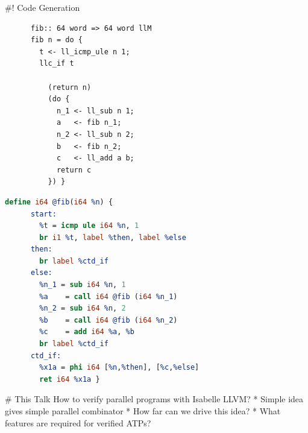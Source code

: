 \documentclass[fleqn]{beamer}
\begin{document}
#! Code Generation

  {\small\centering
  \begin{minipage}[t]{.35\textwidth}
    \begin{lstlisting}
      fib:: 64 word => 64 word llM
      fib n = do {
        t <- ll_icmp_ule n 1;
        llc_if t

          (return n)
          (do {
            n_1 <- ll_sub n 1;
            a   <- fib n_1;
            n_2 <- ll_sub n 2;
            b   <- fib n_2;
            c   <- ll_add a b;
            return c
          }) }
    \end{lstlisting}
  \end{minipage}
  \hfill\pause
  \begin{minipage}[t]{.57\textwidth}
    \begin{lstlisting}[language=LLVM, literate={}]
    define i64 @fib(i64 %n) {
      start:
        %t = icmp ule i64 %n, 1
        br i1 %t, label %then, label %else
      then:
        br label %ctd_if
      else:
        %n_1 = sub i64 %n, 1
        %a    = call i64 @fib (i64 %n_1)
        %n_2 = sub i64 %n, 2
        %b    = call i64 @fib (i64 %n_2)
        %c    = add i64 %a, %b
        br label %ctd_if
      ctd_if:
        %x1a = phi i64 [%n,%then], [%c,%else]
        ret i64 %x1a }
    \end{lstlisting}
  \end{minipage}
  }




# This Talk
  How to verify parallel programs with Isabelle LLVM?
  * Simple idea gives simple parallel combinator
  * How far can we drive this idea?
  * What features are required for verified ATPs?

\end{document}
